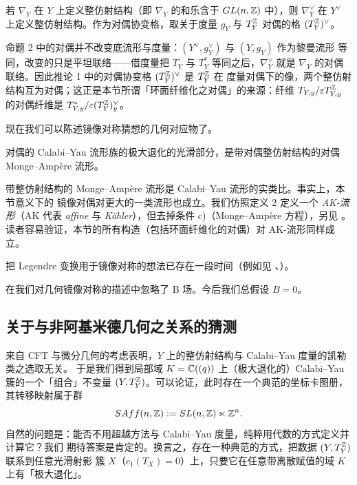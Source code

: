 \begin{crl}
若 $\nabla_Y$ 在 $Y$ 上定义整仿射结构（即 $\nabla_Y$ 的和乐含于 $GL(n,\mathbb{Z})$ 中），则
$\nabla^{\vee}_Y$ 在 $Y^{\vee}$ 上定义整仿射结构。作为对偶协变格，取关于度量 $g_Y$ 与
$T^{\mathbb{Z}}_Y$ 对偶的格 $(T^{\mathbb{Z}}_Y)^{\vee}$。
\end{crl}

\begin{yizhu}[「对偶」改变的是什么]
命题 2 中的对偶并不改变底流形与度量：$(Y^{\vee},g^{\vee}_Y)$ 与 $(Y,g_Y)$ 作为黎曼流形
等同，改变的只是平坦联络——借度量把 $T_Y$ 与 $T^*_Y$ 等同之后，$\nabla^{\vee}_Y$ 就是
$\nabla_Y$ 的对偶联络。因此推论 1 中的对偶协变格 $(T^{\mathbb{Z}}_Y)^{\vee}$ 是 $T^{\mathbb{Z}}_Y$ 在
度量对偶下的像，两个整仿射结构互为对偶；这正是本节所谓「环面纤维化之对偶」的来源：纤维
$T_{Y,y}/\varepsilon T^{\mathbb{Z}}_{Y,y}$ 的对偶纤维是 $T^*_{Y,y}/\varepsilon(T^{\mathbb{Z}}_Y)^{\vee}_y$。
\end{yizhu}

现在我们可以陈述镜像对称猜想的几何对应物了。

\begin{conj}
对偶的 Calabi--Yau 流形族的极大退化的光滑部分，是带对偶整仿射结构的对偶
Monge--Ampère 流形。
\end{conj}

带整仿射结构的 Monge--Ampère 流形是 Calabi--Yau 流形的实类比。事实上，本节意义下的
镜像对偶对更大的一类流形也成立。我们仿照定义 2 定义一个 \emph{AK-流形}（AK 代表
\emph{affine} 与 \emph{Kähler}），但去掉条件 c)（Monge--Ampère 方程），另见 \cite{CY}。
读者容易验证，本节的所有构造（包括环面纤维化的对偶）对 AK-流形同样成立。

\begin{rmk}
把 Legendre 变换用于镜像对称的想法已存在一段时间（例如见 \cite{H}、\cite{Le}）。
\end{rmk}

\begin{rmk}
在我们对几何镜像对称的描述中忽略了 B 场。今后我们总假设 $B=0$。
\end{rmk}

\subsection{关于与非阿基米德几何之关系的猜测}

来自 CFT 与微分几何的考虑表明，$Y$ 上的整仿射结构与 Calabi--Yau 度量的凯勒类之选取无关。
于是我们得到局部域 $K=\mathbb{C}((q))$ 上（极大退化的）Calabi--Yau 簇的一个「组合」不变量
$(Y,T^{\mathbb{Z}}_Y)$。可以论证，此时存在一个典范的坐标卡图册，其转移映射属于群
\[
  SAff(n,\mathbb{Z}):=SL(n,\mathbb{Z})\ltimes\mathbb{Z}^n .
\]
自然的问题是：能否不用超越方法与 Calabi--Yau 度量，纯粹用代数的方式定义并计算它？我们
期待答案是肯定的。换言之，存在一种典范的方式，把数据 $(Y,T^{\mathbb{Z}}_Y)$ 联系到任意光滑射影
簇 $X$（$c_1(T_X)=0$）上，只要它在任意带离散赋值的域 $K$ 上有「极大退化」。

